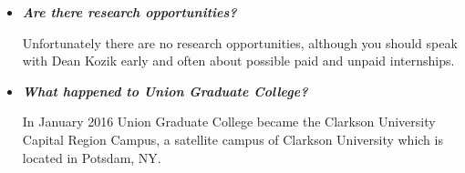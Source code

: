 \documentclass[12pt]{article}
\begin{document}
\begin{itemize}
\item{{\bf {\em Are there research opportunities?}}

Unfortunately there are no research opportunities, although you should speak
with Dean Kozik early and often about possible paid and unpaid internships.}



\item{{\bf {\em What happened to Union Graduate College?}}

In January 2016 Union Graduate College became the Clarkson University Capital
Region Campus, a satellite campus of Clarkson University which is located in
Potsdam, NY.}
  
\end{itemize}
  
\end{document}
